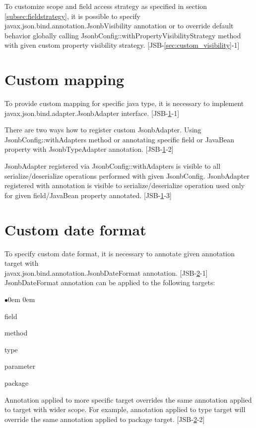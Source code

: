 To customize scope and field access strategy as specified in section \ref{subsec:fieldstrategy}, it is possible to specify javax.json.bind.annotation.JsonbVisibility annotation or to override default behavior globally calling JsonbConfig::withPropertyVisibilityStrategy method with given custom property visibility strategy. [JSB-\ref{sec:custom_visibility}-1]

\section{Custom mapping}
\label{sec:jsonb_adapter}

To provide custom mapping for specific java type, it is necessary to implement javax.json.bind.adapter.JsonbAdapter interface. [JSB-\ref{sec:jsonb_adapter}-1]

There are two ways how to register custom JsonbAdapter. Using JsonbConfig::withAdapters method or annotating specific field or JavaBean property with JsonbTypeAdapter annotation. [JSB-\ref{sec:jsonb_adapter}-2]

JsonbAdapter registered via JsonbConfig::withAdapters is visible to all serialize/deserialize operations performed with given JsonbConfig. JsonbAdapter registered with annotation is visible to serialize/deserialize operation used only for given field/JavaBean property annotated. [JSB-\ref{sec:jsonb_adapter}-3]

\section{Custom date format}
\label{sec:custom_date_format}

To specify custom date format, it is necessary to annotate given annotation target with \\ javax.json.bind.annotation.JsonbDateFormat annotation. [JSB-\ref{sec:custom_date_format}-1] JsonbDateFormat annotation can be applied to the following targets:

\begin{list}{$\bullet$}{\parsep 0em  0em}
\item field
\item method
\item type
\item parameter
\item package
\end{list}

Annotation applied to more specific target overrides the same annotation applied to target with wider scope. For example, annotation applied to type target will override the same annotation applied to package target. [JSB-\ref{sec:custom_date_format}-2]

